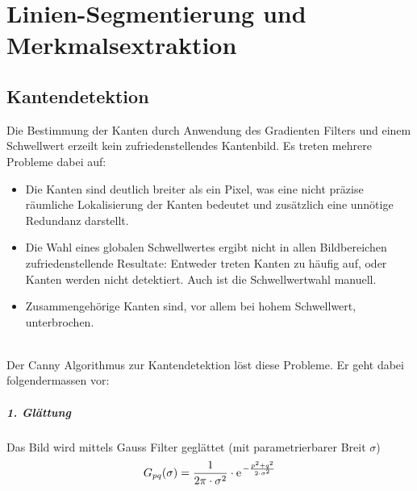 



\chapter{Linien-Segmentierung und Merkmalsextraktion}

\section{Kantendetektion}
Die Bestimmung der Kanten durch Anwendung des Gradienten Filters und einem Schwellwert erzeilt kein zufriedenstellendes Kantenbild. 
Es treten mehrere Probleme dabei auf:
\begin{itemize}
	\item Die Kanten sind deutlich breiter als ein Pixel, was eine nicht präzise räumliche Lokalisierung der Kanten bedeutet und zusätzlich eine unnötige Redundanz darstellt.
	\item Die Wahl eines globalen Schwellwertes ergibt nicht in allen Bildbereichen zufriedenstellende Resultate: Entweder treten Kanten zu häufig auf, oder Kanten werden nicht detektiert. Auch ist die Schwellwertwahl manuell.
	\item Zusammengehörige Kanten sind, vor allem bei hohem Schwellwert, unterbrochen.
\end{itemize}
~\\
Der Canny Algorithmus zur Kantendetektion löst diese Probleme.
Er geht dabei folgendermassen vor:\\
\paragraph{1. Glättung\\}
Das Bild wird mittels Gauss Filter geglättet (mit parametrierbarer Breit $\sigma$)
\[
	G_{pq}(\sigma) = \frac{1}{2\pi\cdot\sigma^2} \cdot \mathrm{e\;\!}^{- \frac{p^2 + q^2}{2 \cdot \sigma^2}}
\]
